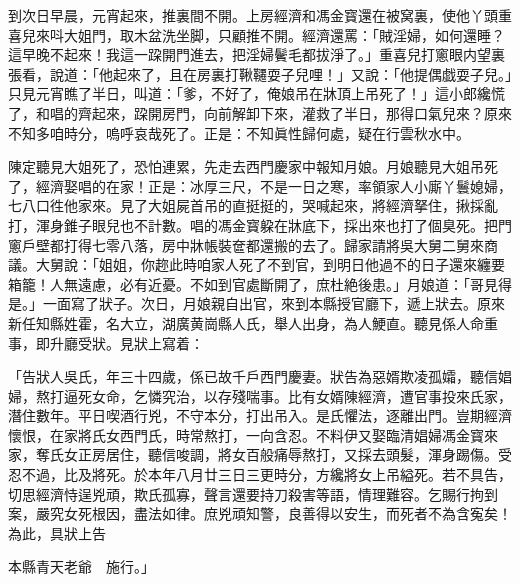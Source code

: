 到次日早晨，元宵起來，推裏間不開。上房經濟和馮金寳還在被窝裏，使他丫頭重喜兒來呌大姐門，取木盆洗坐脚，只顧推不開。經濟還罵：「賊淫婦，如何還睡？這早晚不起來！我這一跥開門進去，把淫婦鬢毛都拔淨了。」重喜兒打窻眼内望裏張看，說道：「他起來了，且在房裏打鞦韆耍子兒哩！」又說：「他提偶戯耍子兒。」只見元宵瞧了半日，叫道：「爹，不好了，俺娘吊在牀頂上吊死了！」這小郎纔慌了，和唱的齊起來，跥開房門，向前解卸下來，灌救了半日，那得口氣兒來？原來不知多咱時分，嗚呼哀哉死了。正是：不知眞性歸何處，疑在行雲秋水中。

陳定聽見大姐死了，恐怕連累，先走去西門慶家中報知月娘。月娘聽見大姐吊死了，經濟娶唱的在家！正是：冰厚三尺，不是一日之寒，率領家人小廝丫鬟媳婦，七八口徃他家來。見了大姐屍首吊的直挺挺的，哭喊起來，將經濟拏住，揪採亂打，渾身錐子眼兒也不計數。唱的馮金寳躱在牀底下，採出來也打了個臭死。把門窻戶壁都打得七零八落，房中牀帳裝奩都還搬的去了。歸家請將吳大舅二舅來商議。大舅說：「姐姐，你趂此時咱家人死了不到官，到明日他過不的日子還來纏要箱籠！人無遠慮，必有近憂。不如到官處斷開了，庶杜絶後患。」月娘道：「哥見得是。」一面寫了狀子。次日，月娘親自出官，來到本縣授官廳下，遞上狀去。原來新任知縣姓霍，名大立，湖廣黄崗縣人氏，舉人出身，為人鯁直。聽見係人命重事，即升廳受狀。見狀上寫着：

\begin{myquote}[\markfont]
「告狀人吳氏，年三十四歲，係已故千戶西門慶妻。狀告為惡婿欺凌孤孀，聽信娼婦，熬打逼死女命，乞憐究治，以存殘喘事。比有女婿陳經濟，遭官事投來氏家，潛住數年。平日喫酒行兇，不守本分，打出吊入。是氏懼法，逐離出門。豈期經濟懷恨，在家將氏女西門氏，時常熬打，一向含忍。不料伊又娶臨清娼婦馮金寳來家，奪氏女正房居住，聽信唆調，將女百般痛辱熬打，又採去頭髮，渾身踢傷。受忍不過，比及將死。於本年八月廿三日三更時分，方纔將女上吊縊死。若不具告，切思經濟恃逞兇頑，欺氏孤寡，聲言還要持刀殺害等語，情理難容。乞賜行拘到案，嚴究女死根因，盡法如律。庶兇頑知警，良善得以安生，而死者不為含寃矣！為此，具狀上告

本縣青天老爺　施行。」
\end{myquote}

